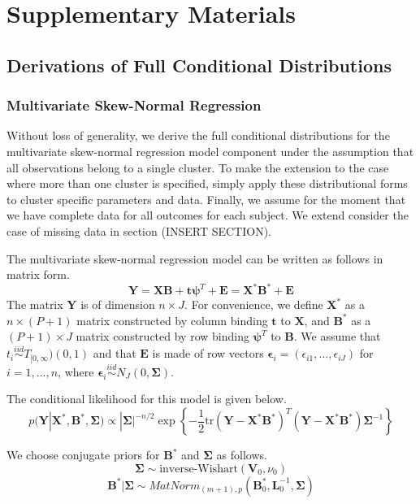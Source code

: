 \documentclass{article}
\newcommand{\tr}{\mbox{tr}}
\begin{document}
\section*{Supplementary Materials}

\subsection*{Derivations of Full Conditional Distributions}

\subsubsection*{Multivariate Skew-Normal Regression}

Without loss of generality, we derive the full conditional distributions for the multivariate skew-normal regression model component under the assumption that all observations belong to a single cluster. To make the extension to the case where more than one cluster is specified, simply apply these distributional forms to cluster specific parameters and data. Finally, we assume for the moment that we have complete data for all outcomes for each subject. We extend consider the case of missing data in section (INSERT SECTION).

The multivariate skew-normal regression model can be written as follows in matrix form. 
$$\mathbf{Y} = \mathbf{X}\mathbf{B} + \mathbf{t} \boldsymbol\psi^T + \mathbf{E} = \mathbf{X}^* \mathbf{B}^* + \mathbf{E}$$
The matrix $\mathbf{Y}$ is of dimension $n \times J$. For convenience, we define $\mathbf{X}^*$ as a $n \times (P + 1)$ matrix constructed by column binding $\mathbf{t}$ to $\mathbf{X}$, and $\mathbf{B}^*$ as a $(P+1) \times J$ matrix constructed by row binding $\boldsymbol\psi^T$ to $\mathbf{B}$. We assume that $t_i \stackrel{iid}{\sim}T_{[0,\infty})(0,1)$ and that $\mathbf{E}$ is made of row vectors $\boldsymbol\epsilon_i = (\epsilon_{i1},...,\epsilon_{iJ})$ for $i = 1,...,n$, where $ \boldsymbol\epsilon_i \stackrel{iid}{\sim} N_J(0, \boldsymbol\Sigma)$.

The conditional likelihood for this model is given below. 
$$p(\mathbf{Y}|\mathbf{X}^*,\mathbf{B}^*,\boldsymbol\Sigma) \propto |\boldsymbol\Sigma|^{-n/2}\exp \left \{ -\frac{1}{2} \tr(\mathbf{Y} - \mathbf{X}^* \mathbf{B}^*)^T(\mathbf{Y} - \mathbf{X}^* \mathbf{B}^*)\boldsymbol\Sigma^{-1} \right \}$$

We choose conjugate priors for $\mathbf{B}^*$ and $\boldsymbol\Sigma$ as follows. 
$$\boldsymbol\Sigma \sim \text{inverse-Wishart}(\mathbf{V}_0,\nu_0)$$
$$\mathbf{B}^*|\boldsymbol\Sigma \sim MatNorm_{(m+1), p}(\mathbf{B}_0^*,\mathbf{L}_0^{-1},\boldsymbol\Sigma)$$
\end{document}
